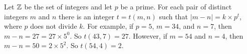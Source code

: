 {\begin{comment}
\item ~
	\begin{enumerate}[i.]
	\item  We look for all points $x$ in $\R^2$ such that $d(x,a) < 1$. That is, the set of points $x$ such that $|x| + |a| < 1$. Now $|a| = \frac{1}{2}$, so we look for the set of points $x$ in $\R^2$ such that $|x| < 1-\frac{1}{2} = \frac{1}{2}$. If $x = (x_1,x_2)$, we then want all of the points satisfying $|x|^2 = x_1^2+x_2^2 < \frac{1}{4}$. This set of points satisfying $x_1^2+x_2^2 = \frac{1}{4}$ is the Euclidean circle centered at the origin of radius $\frac{1}{2}$. So 
\[B(a,1) = \{a\} \cup \left\{(x_1,x_2) \mid x_1^2+x_2^2 < \left(\frac{1}{2}\right)^2\right\}\]
is the point $a$ along with the open Euclidean disk of radius $\frac{1}{2}$ centered at the origin as illustrated in Figure \ref{F:Hub_metric}.
\begin{figure}[h]
\begin{center}
\resizebox{!}{2.0in}{\texttt{[image: Hub\_metric.png]}}
\caption{The open ball $B(a,1)$.} 
\label{F:Hub_metric}
\end{center}
\end{figure}

	\item Notice that $|a| = \sqrt{3^2+4^2} = \sqrt{25} = 5$. So if $x \in B(a,1)$, then 
\[d_H(x,a) = |x|+|a| = |x| + 5 < 1.\]
Bu this makes $|x| < -4$, which is not possible. So $B(a,1) = \{a\}$. 

	\item Let $a \in \R^2$, and let $r > 0$. Then $x \in B(a,r)$ when 
\[d_H(x,a) = |x| + |a| < r\]
or $B(a,r)$ is the set consisting of $a$ and of all $x \in \R^2$ such that 
\[|x| < r - |a|.\]
If $r-|a| \leq 0$, then the only point in $B(a,r)$ is $a$. If $r > |a|$, then $B(a,r)$ is the open Euclidean disk centered at the origin of radius $r - |a|$ along with the point $a$.  Note that if $|a| < r \leq 2|a|$, then $r - |a| \leq |a|$ and so $a$ is not in the open Euclidean ball centered at the origin of radius $r$. But when $r \geq 2|a|$, then $a$ is in this disk. 
	
	\end{enumerate}
	
\ea

\end{comment}


\item Let $\mathbb{Z}$ be the set of integers and let $p$ be a prime. For each pair of distinct integers $m$ and $n$ there is an integer $t = t(m,n)$ such that $|m-n| = k \times p^t$, where $p$ does not divide $k$. For example, if $p=5$, $m = 34$, and $n = 7$, then $m-n = 27 = 27 \times 5^0$. So $t(43,7) = 27$. However, if $m = 54$ and $n = 4$, then $m-n = 50 = 2 \times 5^2$. So $t(54,4) = 2$. 

}
